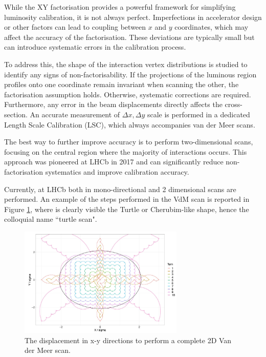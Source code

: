 While the XY factorisation provides a powerful framework for simplifying luminosity calibration, it is not always perfect. Imperfections in accelerator design or other factors can lead to coupling between $x$ and $y$ coordinates, which may affect the accuracy of the factorisation. These deviations are typically small but can introduce systematic errors in the calibration process.

To address this, the shape of the interaction vertex distributions is studied to identify any signs of non-factorisability. If the projections of the luminous region profiles onto one coordinate remain invariant when scanning the other, the factorisation assumption holds. Otherwise, systematic corrections are required. Furthermore, any error in the beam displacements directly affects the cross-section. An accurate measurement of $\Delta x, \Delta y$ scale is performed in a dedicated Length Scale Calibration (LSC), which always accompanies van der Meer scans. 

The best way to further improve accuracy is to perform two-dimensional scans, focusing on the central region where the majority of interactions occurs. This approach was pioneered at LHCb in 2017 and can significantly reduce non-factorisation systematics and improve calibration accuracy\cite{Balagura_2021}.

Currently, at LHCb both in mono-directional and 2 dimensional scans are performed. An example of the steps performed in the VdM scan is reported in Figure \ref{fig:vdm_steps_xy}, where is clearly visible the Turtle or Cherubim-like shape, hence the colloquial name ``turtle scan".

\begin{figure}
    \centering
    \includegraphics[width=0.7\textwidth]{figures/vdm_steps_xy.png}
    \caption{The displacement in x-y directions to perform a complete 2D Van der Meer scan.}
    \label{fig:vdm_steps_xy}
\end{figure}




